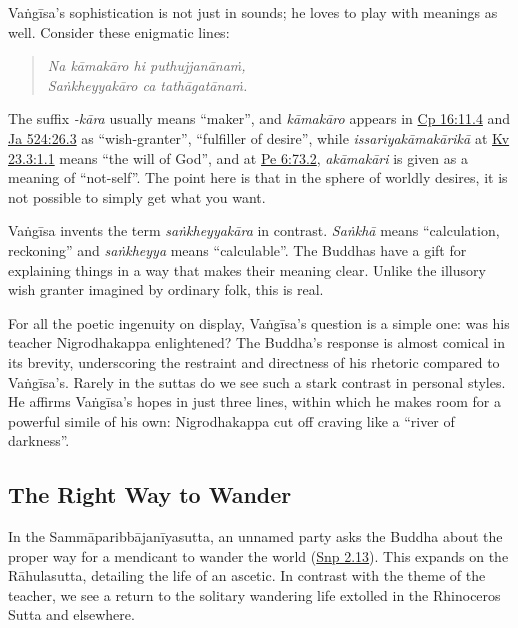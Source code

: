 \documentclass[12pt,openany]{book}%
\begin{document}
\textsanskrit{Vaṅgīsa}’s sophistication is not just in sounds; he loves to play with meanings as well. Consider these enigmatic lines:

\begin{quotation}%
\textit{Na \textsanskrit{kāmakāro} hi \textsanskrit{puthujjanānaṁ},} \\
\textit{\textsanskrit{Saṅkheyyakāro} ca \textsanskrit{tathāgatānaṁ}.}

%
\end{quotation}

The suffix \textit{-\textsanskrit{kāra}} usually means “maker”, and \textit{\textsanskrit{kāmakāro}} appears in \href{https://suttacentral.net/cp16}{Cp 16:11.4} and \href{https://suttacentral.net/ja524}{Ja 524:26.3} as “wish-granter”, “fulfiller of desire”, while \textit{\textsanskrit{issariyakāmakārikā}} at \href{https://suttacentral.net/kv23.3}{Kv 23.3:1.1} means “the will of God”, and at \href{https://suttacentral.net/pe6}{Pe 6:73.2}, \textit{\textsanskrit{akāmakāri}} is given as a meaning of “not-self”. The point here is that in the sphere of worldly desires, it is not possible to simply get what you want.

\textsanskrit{Vaṅgīsa} invents the term \textit{\textsanskrit{saṅkheyyakāra}} in contrast. \textit{\textsanskrit{Saṅkhā}} means “calculation, reckoning” and \textit{\textsanskrit{saṅkheyya}} means “calculable”. The Buddhas have a gift for explaining things in a way that makes their meaning clear. Unlike the illusory wish granter imagined by ordinary folk, this is real.

For all the poetic ingenuity on display, \textsanskrit{Vaṅgīsa}’s question is a simple one: was his teacher Nigrodhakappa enlightened? The Buddha’s response is almost comical in its brevity, underscoring the restraint and directness of his rhetoric compared to \textsanskrit{Vaṅgīsa}’s. Rarely in the suttas do we see such a stark contrast in personal styles. He affirms \textsanskrit{Vaṅgīsa}’s hopes in just three lines, within which he makes room for a powerful simile of his own: Nigrodhakappa cut off craving like a “river of darkness”.

\subsection*{The Right Way to Wander}

In the \textsanskrit{Sammāparibbājanīyasutta}, an unnamed party asks the Buddha about the proper way for a mendicant to wander the world (\href{https://suttacentral.net/snp2.13/en/sujato}{Snp 2.13}). This expands on the \textsanskrit{Rāhulasutta}, detailing the life of an ascetic. In contrast with the theme of the teacher, we see a return to the solitary wandering life extolled in the Rhinoceros Sutta and elsewhere.
\end{document}

